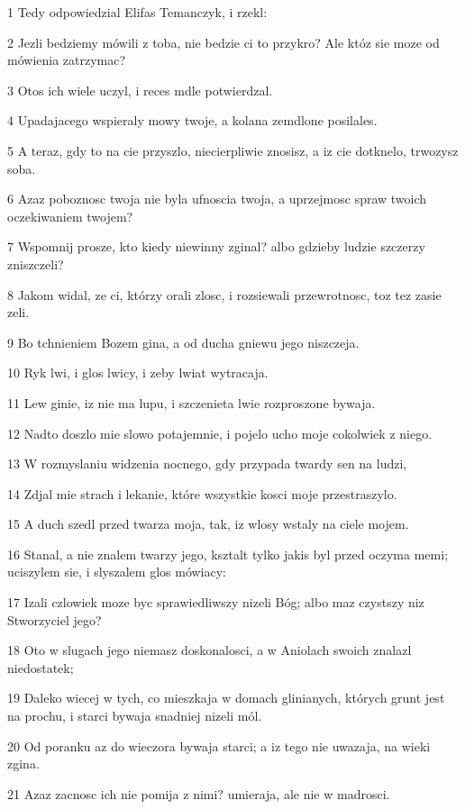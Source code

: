 \par 1 Tedy odpowiedzial Elifas Temanczyk, i rzekl:
\par 2 Jezli bedziemy mówili z toba, nie bedzie ci to przykro? Ale któz sie moze od mówienia zatrzymac?
\par 3 Otos ich wiele uczyl, i reces mdle potwierdzal.
\par 4 Upadajacego wspieraly mowy twoje, a kolana zemdlone posilales.
\par 5 A teraz, gdy to na cie przyszlo, niecierpliwie znosisz, a iz cie dotknelo, trwozysz soba.
\par 6 Azaz poboznosc twoja nie byla ufnoscia twoja, a uprzejmosc spraw twoich oczekiwaniem twojem?
\par 7 Wspomnij prosze, kto kiedy niewinny zginal? albo gdzieby ludzie szczerzy zniszczeli?
\par 8 Jakom widal, ze ci, którzy orali zlosc, i rozsiewali przewrotnosc, toz tez zasie zeli.
\par 9 Bo tchnieniem Bozem gina, a od ducha gniewu jego niszczeja.
\par 10 Ryk lwi, i glos lwicy, i zeby lwiat wytracaja.
\par 11 Lew ginie, iz nie ma lupu, i szczenieta lwie rozproszone bywaja.
\par 12 Nadto doszlo mie slowo potajemnie, i pojelo ucho moje cokolwiek z niego.
\par 13 W rozmyslaniu widzenia nocnego, gdy przypada twardy sen na ludzi,
\par 14 Zdjal mie strach i lekanie, które wszystkie kosci moje przestraszylo.
\par 15 A duch szedl przed twarza moja, tak, iz wlosy wstaly na ciele mojem.
\par 16 Stanal, a nie znalem twarzy jego, ksztalt tylko jakis byl przed oczyma memi; uciszylem sie, i slyszalem glos mówiacy:
\par 17 Izali czlowiek moze byc sprawiedliwszy nizeli Bóg; albo maz czystszy niz Stworzyciel jego?
\par 18 Oto w slugach jego niemasz doskonalosci, a w Aniolach swoich znalazl niedostatek;
\par 19 Daleko wiecej w tych, co mieszkaja w domach glinianych, których grunt jest na prochu, i starci bywaja snadniej nizeli mól.
\par 20 Od poranku az do wieczora bywaja starci; a iz tego nie uwazaja, na wieki zgina.
\par 21 Azaz zacnosc ich nie pomija z nimi? umieraja, ale nie w madrosci.

